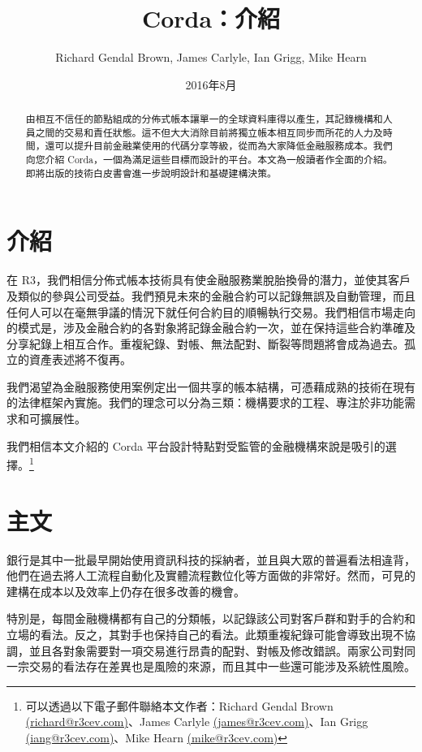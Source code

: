 ﻿\documentclass{article}
\author{Richard Gendal Brown, James Carlyle, Ian Grigg, Mike Hearn}
\date{2016年8月}
\title{Corda：介紹}
\begin{document}
\maketitle 
\begin{abstract}
由相互不信任的節點組成的分佈式帳本讓單一的全球資料庫得以產生，其記錄機構和人員之間的交易和責任狀態。這不但大大消除目前將獨立帳本相互同步而所花的人力及時間，還可以提升目前金融業使用的代碼分享等級，從而為大家降低金融服務成本。我們向您介紹 Corda，一個為滿足這些目標而設計的平台。本文為一般讀者作全面的介紹。即將出版的技術白皮書會進一步說明設計和基礎建構決策。
\end{abstract}
\newpage
\tableofcontents
\newpage
\section{介紹}
在 R3，我們相信分佈式帳本技術具有使金融服務業脫胎換骨的潛力，並使其客戶及類似的參與公司受益。我們預見未來的金融合約可以記錄無誤及自動管理，而且任何人可以在毫無爭議的情況下就任何合約目的順暢執行交易。我們相信市場走向的模式是，涉及金融合約的各對象將記錄金融合約一次，並在保持這些合約準確及分享紀錄上相互合作。重複紀錄、對帳、無法配對、斷裂等問題將會成為過去。孤立的資產表述將不復再。

我們渴望為金融服務使用案例定出一個共享的帳本結構，可憑藉成熟的技術在現有的法律框架內實施。我們的理念可以分為三類：機構要求的工程、專注於非功能需求和可擴展性。

我們相信本文介紹的 Corda 平台設計特點對受監管的金融機構來說是吸引的選擇。\footnote{可以透過以下電子郵件聯絡本文作者：Richard Gendal Brown \href{mailto:richard@r3cev.com}{(richard@r3cev.com)}、James Carlyle \href{mailto:james@r3cev.com}{(james@r3cev.com)}、Ian Grigg \href{mailto:iang@r3cev.com}{(iang@r3cev.com)}、Mike Hearn \href{mailto:mike@r3cev.com}{(mike@r3cev.com)}}

\section{主文}
銀行是其中一批最早開始使用資訊科技的採納者，並且與大眾的普遍看法相違背，他們在過去將人工流程自動化及實體流程數位化等方面做的非常好。然而，可見的建構在成本以及效率上仍存在很多改善的機會。 

特別是，每間金融機構都有自己的分類帳，以記錄該公司對客戶群和對手的合約和立場的看法。反之，其對手也保持自己的看法。此類重複紀錄可能會導致出現不協調，並且各對象需要對一項交易進行昂貴的配對、對帳及修改錯誤。兩家公司對同一宗交易的看法存在差異也是風險的來源，而且其中一些還可能涉及系統性風險。
\end{document}
